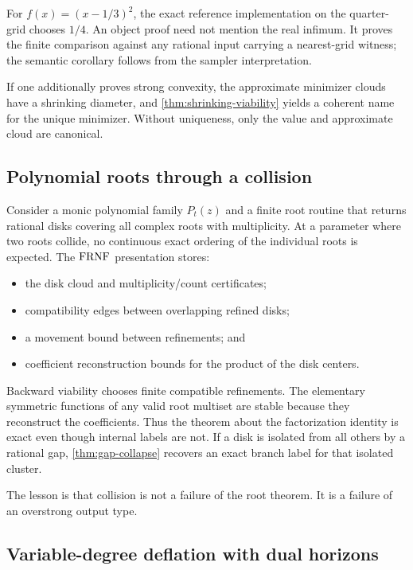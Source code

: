 For \(f(x)=(x-1/3)^2\), the exact reference implementation on the quarter-grid chooses
\(1/4\).  An object proof need not mention the real infimum.  It proves the finite
comparison against any rational input carrying a nearest-grid witness; the semantic
corollary follows from the sampler interpretation.

If one additionally proves strong convexity, the approximate minimizer clouds have a
shrinking diameter, and \cref{thm:shrinking-viability} yields a coherent name for the
unique minimizer.  Without uniqueness, only the value and approximate cloud are
canonical.

\subsection{Polynomial roots through a collision}

Consider a monic polynomial family \(P_t(z)\) and a finite root routine that returns
rational disks covering all complex roots with multiplicity.  At a parameter where two
roots collide, no continuous exact ordering of the individual roots is expected.  The
\(\mathrm{FRNF}\) presentation stores:

\begin{itemize}
\item the disk cloud and multiplicity/count certificates;
\item compatibility edges between overlapping refined disks;
\item a movement bound between refinements; and
\item coefficient reconstruction bounds for the product of the disk centers.
\end{itemize}

Backward viability chooses finite compatible refinements.  The elementary symmetric
functions of any valid root multiset are stable because they reconstruct the
coefficients.  Thus the theorem about the factorization identity is exact even though
internal labels are not.  If a disk is isolated from all others by a rational gap,
\cref{thm:gap-collapse} recovers an exact branch label for that isolated cluster.

The lesson is that collision is not a failure of the root theorem.  It is a failure of
an overstrong output type.

\subsection{Variable-degree deflation with dual horizons}

